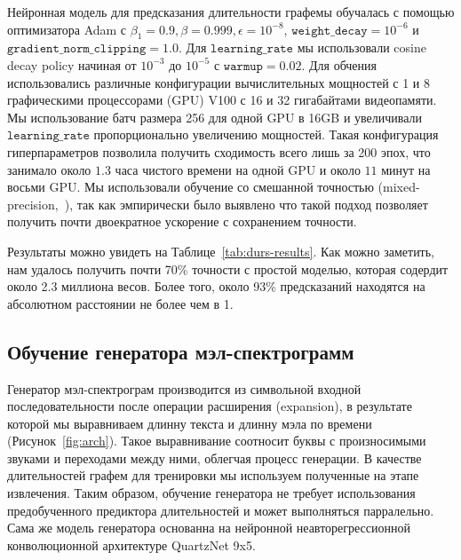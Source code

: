 Нейронная модель для предсказания длительности графемы обучалась с помощью оптимизатора Adam с $\beta_1=0.9,\beta=0.999,\epsilon=10^{-8}$, $\texttt{weight\_decay}={10}^{-6}$ и $\texttt{gradient\_norm\_clipping}=1.0$. Для $\texttt{learning\_rate}$ мы использовали cosine decay policy начиная от $10^{-3}$ до $10^{-5}$ с $\texttt{warmup}=0.02$. Для обчения использовались различные конфигурации вычислительных мощностей с 1 и 8 графическими процессорами (GPU) V100 с 16 и 32 гигабайтами видеопамяти. Мы использование батч размера 256 для одной GPU в 16GB и увеличивали $\texttt{learning\_rate}$ пропорционально увеличению мощностей. Такая конфигурация гиперпараметров позволила получить сходимость всего лишь за 200 эпох, что занимало около $1.3$ часа чистого времени на одной GPU и около $11$ минут на восьми GPU. Мы использовали обучение со смешанной точностью (mixed-precision,~\cite{micikevicius}), так как эмпирически было выявлено что такой подход позволяет получить почти двоекратное ускорение с сохранением точности.

Результаты можно увидеть на Таблице~\ref{tab:durs-results}. Как можно заметить, нам удалось получить почти 70\% точности с простой моделью, которая содердит около 2.3 миллиона весов. Более того, около 93\% предсказаний находятся на абсолютном расстоянии не более чем в 1.

\subsection{Обучение генератора мэл-спектрограмм}

Генератор мэл-спектрограм производится из символьной входной последовательности после операции расширения (expansion), в результате которой мы выравниваем длинну текста и длинну мэла по времени (Рисунок~\ref{fig:arch}). Такое выравнивание соотносит буквы с произносимыми звуками и переходами между ними, облегчая процесс генерации. В качестве длительностей графем для тренировки мы используем полученные на этапе извлечения. Таким образом, обучение генератора не требует использования предобученного предиктора длительностей и может выполняться парралельно. Сама же модель генератора основанна на нейронной неавторегрессионной конволюционной архитектуре QuartzNet 9x5.

